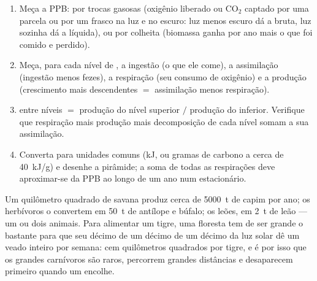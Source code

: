 \begin{method}\label{met:b1:ecosystem-organization:budget}
\begin{enumerate}
  \item Meça a PPB: por trocas gasosas (oxigênio liberado ou
        $\mathrm{CO_2}$ captado por uma parcela ou por um frasco na
        luz e no escuro: luz menos escuro dá a bruta, luz sozinha dá a
        líquida), ou por colheita (biomassa ganha por ano mais o que
        foi comido e perdido).
  \item Meça, para cada nível de , a ingestão (o que ele
        come), a assimilação (ingestão menos fezes), a respiração (seu
        consumo de oxigênio) e a produção (crescimento mais
        descendentes $=$ assimilação menos respiração).
  \item {} entre níveis $=$ produção do nível superior
        $/$ produção do inferior. Verifique que respiração mais
        produção mais decomposição de cada nível somam a sua
        assimilação.
  \item Converta para unidades comuns (\unit{kJ}, ou gramas de carbono
        a cerca de \qty{40}{kJ/g}) e desenhe a pirâmide; a soma de
        todas as respirações deve aproximar-se da PPB ao longo de um
        ano num  estacionário.
\end{enumerate}
\end{method}

\begin{example}\label{ex:b1:ecosystem-organization:top}
Um quilômetro quadrado de savana produz cerca de \qty{5000}{t} de
capim por ano; os herbívoros o convertem em \qty{50}{t} de antílope e
búfalo; os leões, em \qty{2}{t} de leão --- um ou dois animais. Para
alimentar um tigre, uma floresta tem de ser grande o bastante para que
seu décimo de um décimo de um décimo da luz solar dê um veado inteiro
por semana: cem quilômetros quadrados por tigre, e é por isso que os
grandes carnívoros são raros, percorrem grandes distâncias e
desaparecem primeiro quando um  encolhe.
\end{example}

